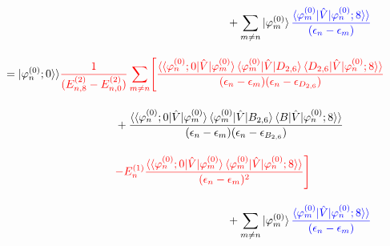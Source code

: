 \begin{align}
    &\hspace{200pt}+
    \sum_{m\neq n}\ket{\varphi^{(0)}_m}
    \textcolor{blue}{
    \frac{\braket{\varphi^{(0)}_{m}|\hat{V}|\varphi^{(0)}_n;8}\rangle}{(\epsilon_n-\epsilon_m)}}\nn[10pt]
    &=
    |\varphi^{(0)}_n;0\rangle\rangle
    \textcolor{red}{\frac{1}{(E^{(2)}_{n,8}-E^{(2)}_{n,0})}
    \sum_{m\neq n}\Biggl[
    \frac{\langle\braket{\varphi^{(0)}_{n};0|\hat{V}|\varphi^{(0)}_m}
    \langle{\varphi^{(0)}_{m}|\hat{V}|D_{2,6}}\rangle
    \braket{D_{2,6}|\hat{V}|\varphi^{(0)}_n;8}\rangle}
    {(\epsilon_n-\epsilon_m)(\epsilon_n-\epsilon_{D_{2,6}})}}\nn[10pt]
    &\hspace{100pt}
    +{\frac{\langle\braket{\varphi^{(0)}_{n};0|\hat{V}|\varphi^{(0)}_m}
    \langle{\varphi^{(0)}_{m}|\hat{V}|B_{2,6}}\rangle
    \braket{B|\hat{V}|\varphi^{(0)}_n;8}\rangle}
    {(\epsilon_n-\epsilon_m)(\epsilon_n-\epsilon_{B_{2,6}})}}\nn[10pt]
    &\hspace{100pt}
    \textcolor{red}{-E^{(1)}_n
    \frac{\langle\braket{\varphi^{(0)}_{n};0|\hat{V}|\varphi^{(0)}_m}
    \braket{\varphi^{(0)}_{m}|\hat{V}|\varphi^{(0)}_n;8}\rangle}{(\epsilon_n-\epsilon_m)^2}
    \Biggr]}
    \nn[10pt]
    &\hspace{200pt}+
    \sum_{m\neq n}\ket{\varphi^{(0)}_m}
    \textcolor{blue}{
    \frac{\braket{\varphi^{(0)}_{m}|\hat{V}|\varphi^{(0)}_n;8}\rangle}{(\epsilon_n-\epsilon_m)}}
\end{align}



